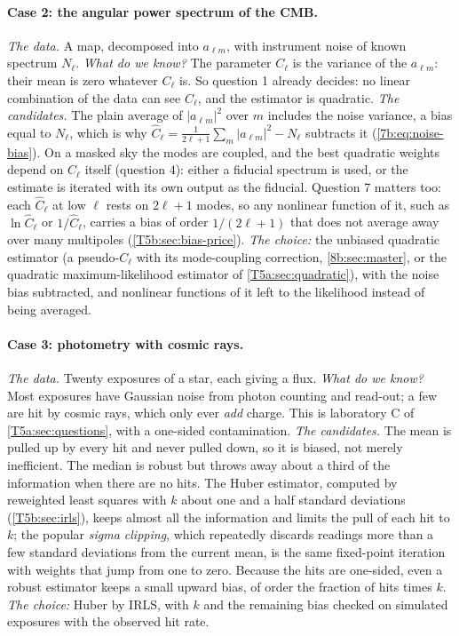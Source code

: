 \paragraph{Case 2: the angular power spectrum of the CMB.}
\emph{The data.} A map, decomposed into $a_{\ell m}$, with instrument noise of
known spectrum $N_\ell$. \emph{What do we know?} The parameter $C_\ell$ is the
variance of the $a_{\ell m}$: their mean is zero whatever $C_\ell$ is. So
question 1 already decides: no linear combination of the data can see
$C_\ell$, and the estimator is quadratic. \emph{The candidates.} The plain
average of $|a_{\ell m}|^2$ over $m$ includes the noise variance, a bias equal to
$N_\ell$, which is why $\hat C_\ell=\frac1{2\ell+1}\sum_m|a_{\ell m}|^2-N_\ell$ subtracts it
(\cref{7b:eq:noise-bias}). On a masked sky the modes are coupled, and the
best quadratic weights depend on $C_\ell$ itself (question 4): either a fiducial
spectrum is used, or the estimate is iterated with its own output as the
fiducial. Question 7 matters too: each $\hat C_\ell$ at low $\ell$ rests on
$2\ell+1$ modes, so any nonlinear function of it, such as $\ln\hat C_\ell$ or
$1/\hat C_\ell$, carries a bias of order $1/(2\ell+1)$ that does not average away
over many multipoles (\cref{T5b:sec:bias-price}). \emph{The choice:} the
unbiased quadratic estimator (a pseudo-$C_\ell$ with its mode-coupling
correction, \cref{8b:sec:master}, or the quadratic maximum-likelihood
estimator of \cref{T5a:sec:quadratic}), with the noise bias subtracted, and
nonlinear functions of it left to the likelihood instead of being averaged.

\paragraph{Case 3: photometry with cosmic rays.}
\emph{The data.} Twenty exposures of a star, each giving a flux. \emph{What do
we know?} Most exposures have Gaussian noise from photon counting and
read-out; a few are hit by cosmic rays, which only ever \emph{add} charge.
This is laboratory C of \cref{T5a:sec:questions}, with a one-sided
contamination. \emph{The candidates.} The mean is pulled up by every hit and
never pulled down, so it is biased, not merely inefficient. The median is
robust but throws away about a third of the information when there are no
hits. The Huber estimator, computed by reweighted least squares with $k$
about one and a half standard deviations (\cref{T5b:sec:irls}), keeps
almost all the information and limits the pull of each hit to $k$; the
popular \emph{sigma clipping}, which repeatedly discards readings more than a
few standard deviations from the current mean, is the same fixed-point
iteration with weights that jump from one to zero. Because the hits are
one-sided, even a robust estimator keeps a small upward bias, of order the
fraction of hits times $k$. \emph{The choice:} Huber by IRLS, with $k$ and the
remaining bias checked on simulated exposures with the observed hit rate.

